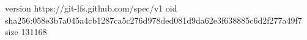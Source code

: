 version https://git-lfs.github.com/spec/v1
oid sha256:058e3b7a045a4cb1287ca5c276d978ded081d9da62e3f638885c6d2f277a49f7
size 131168
